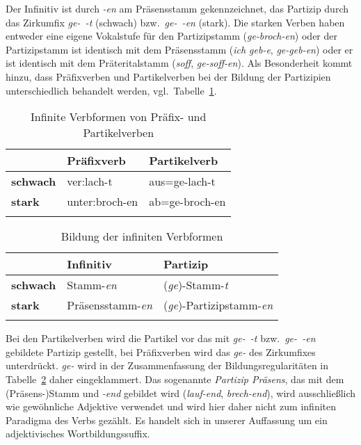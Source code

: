 Der Infinitiv ist durch \textit{-en} am Präsensstamm gekennzeichnet, das Partizip durch das Zirkumfix \textit{ge-~-t} (schwach) bzw.\ \textit{ge-~-en} (stark).
Die starken Verben haben entweder eine eigene Vokalstufe für den Partizipstamm (\textit{ge-broch-en}) oder der Partizipstamm ist identisch mit dem Präsensstamm (\textit{ich geb-e}, \textit{ge-geb-en}) oder er ist identisch mit dem Präteritalstamm (\textit{soff}, \textit{ge-soff-en}).
Als Besonderheit kommt hinzu, dass Präfixverben und Partikelverben bei der Bildung der Partizipien unterschiedlich behandelt werden, vgl.\ Tabelle~\ref{tab:infiniteformen102}.


\begin{table}[!htbp]
  \centering
  \begin{tabular}{lll}
    \lsptoprule
    & \textbf{Präfixverb} & \textbf{Partikelverb} \\
    \midrule
    \textbf{schwach} & ver:lach-t & aus=ge-lach-t \\
    \textbf{stark} & unter:broch-en & ab=ge-broch-en\\
    \lspbottomrule
  \end{tabular}
  \caption{Infinite Verbformen von Präfix- und Partikelverben}
  \label{tab:infiniteformen102}
\end{table}

\begin{table}[!htbp]
  \centering
  \begin{tabular}{lll}
    \lsptoprule
    & \textbf{Infinitiv} & \textbf{Partizip} \\
    \midrule
    \textbf{schwach} & Stamm-\textit{en} & (\textit{ge})-Stamm-\textit{t} \\
    \textbf{stark} & Präsensstamm-\textit{en} & (\textit{ge})-Partizipstamm-\textit{en} \\
    \lspbottomrule
  \end{tabular}
  \caption{Bildung der infiniten Verbformen}
  \label{tab:infiniteformen103}
\end{table}

Bei den Partikelverben wird die Partikel vor das mit \textit{ge-~-t} bzw.\ \textit{ge-~-en} gebildete Partizip gestellt, bei Präfixverben wird das \textit{ge-} des Zirkumfixes unterdrückt.
\textit{ge-} wird in der Zusammenfassung der Bildungsregularitäten in Tabelle~\ref{tab:infiniteformen103} daher eingeklammert.
Das sogenannte \textit{Partizip Präsens}, das mit dem (Präsens-)Stamm und \textit{-end} gebildet wird (\textit{lauf-end}, \textit{brech-end}), wird ausschließlich wie gewöhnliche Adjektive verwendet und wird hier daher nicht zum infiniten Paradigma des Verbs gezählt.
Es handelt sich in unserer Auffassung um ein adjektivisches Wortbildungssuffix.

